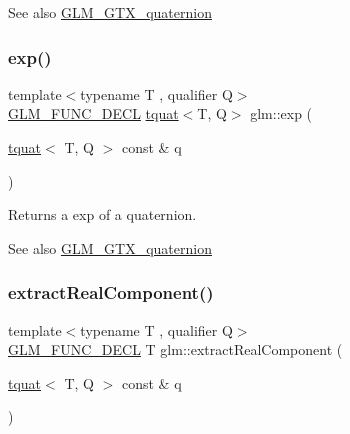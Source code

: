 \begin{DoxySeeAlso}{See also}
\hyperlink{group__gtx__quaternion}{G\+L\+M\+\_\+\+G\+T\+X\+\_\+quaternion} 
\end{DoxySeeAlso}
\mbox{\label{group__gtx__quaternion_ga72275e87ce62dc75a06d39a6c049835c}} 
\subsubsection{\texorpdfstring{exp()}{exp()}}
{\footnotesize\ttfamily template$<$typename T , qualifier Q$>$ \\
\hyperlink{setup_8hpp_ab2d052de21a70539923e9bcbf6e83a51}{G\+L\+M\+\_\+\+F\+U\+N\+C\+\_\+\+D\+E\+CL} \hyperlink{structglm_1_1tquat}{tquat}$<$T, Q$>$ glm\+::exp (\begin{DoxyParamCaption}\item[{\hyperlink{structglm_1_1tquat}{tquat}$<$ T, Q $>$ const \&}]{q }\end{DoxyParamCaption})}

Returns a exp of a quaternion.

\begin{DoxySeeAlso}{See also}
\hyperlink{group__gtx__quaternion}{G\+L\+M\+\_\+\+G\+T\+X\+\_\+quaternion} 
\end{DoxySeeAlso}
\mbox{\label{group__gtx__quaternion_ga312385d0a8caa24c1daaa1d00ce4c2d3}} 
\subsubsection{\texorpdfstring{extract\+Real\+Component()}{extractRealComponent()}}
{\footnotesize\ttfamily template$<$typename T , qualifier Q$>$ \\
\hyperlink{setup_8hpp_ab2d052de21a70539923e9bcbf6e83a51}{G\+L\+M\+\_\+\+F\+U\+N\+C\+\_\+\+D\+E\+CL} T glm\+::extract\+Real\+Component (\begin{DoxyParamCaption}\item[{\hyperlink{structglm_1_1tquat}{tquat}$<$ T, Q $>$ const \&}]{q }\end{DoxyParamCaption})}

